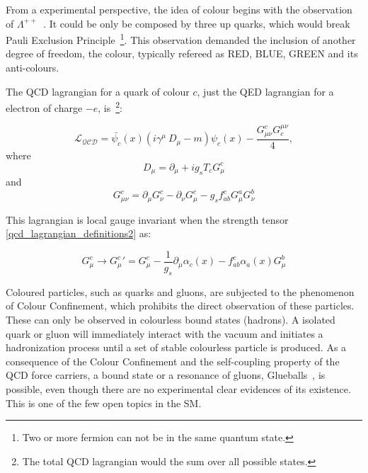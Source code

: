 From a experimental perspective, the idea of colour begins with the observation of $\Lambda^{++}$~\cite{dalitz1967proceedings}. It could be only be composed by three up quarks, which would break Pauli Exclusion Principle~\footnote{Two or more fermion can not be in the same quantum state.}. This observation demanded the inclusion of another degree of freedom, the colour, typically refereed as RED, BLUE, GREEN and its anti-colours.

The QCD lagrangian for a quark of colour $c$, just the QED lagrangian for a electron of charge $-e$, is~\footnote{The total QCD lagrangian would the sum over all possible states.}:

\begin{equation}
    \mathcal{L_{QCD}} = \bar{\psi_c}(x)(i\gamma^\mu\ D_\mu -m)\psi_c(x) - \frac{G_{\mu\nu}^c G^{\mu\nu}_c}{4},
\label{qcd_lagrangian}
\end{equation}
where
\begin{equation}
    D_\mu = \partial_\mu + ig_s T_c G_\mu^c
\label{qcd_lagrangian_definitions1}
\end{equation}
and 
\begin{equation}
    G_{\mu\nu}^c = \partial_\mu G_\nu^c - \partial_\nu G_\mu^c - g_s f_{ab}^c G_\mu^a G_\nu^b
\label{qcd_lagrangian_definitions2}
\end{equation}

This lagrangian is local gauge invariant when the strength tensor \ref{qcd_lagrangian_definitions2} as:

\begin{equation}
    G_{\mu}^c \rightarrow {G_{\mu}^c}' = G_{\mu}^c - \frac{1}{g_s} \partial_\mu \alpha_c(x) - f_{ab}^c \alpha_a(x) G_{\mu}^b
\label{strength_tensor_tranform}
\end{equation}

Coloured particles, such as quarks and gluons, are subjected to the phenomenon of Colour Confinement, which prohibits the direct observation of these particles. These can only be observed in colourless bound states (hadrons). A isolated quark or gluon will immediately interact with the vacuum and initiates a hadronization process until a set of stable colourless particle is produced. As a consequence of the Colour Confinement and the self-coupling property of the QCD force carriers, a bound state or a resonance of gluons, Glueballs~\cite{wolfgang_status}, is possible, even though there are no experimental clear evidences of its existence. This is one of the few open topics in the SM.

